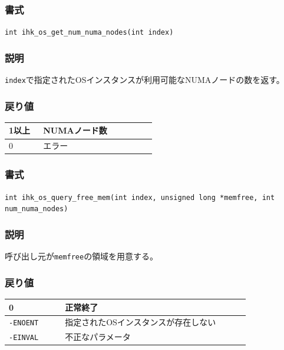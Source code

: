 \documentclass[twoside,11pt,fleqn]{book}
\begin{document}
\subsubsection{}
\subsubsection*{書式}{\quad} \texttt{int ihk\_os\_get\_num\_numa\_nodes(int index)}
\subsubsection*{説明}{\quad} \texttt{index}で指定されたOSインスタンスが利用可能なNUMAノードの数を返す。
\subsubsection*{戻り値}
\begin{table}[!h]
\footnotesize
\begin{tabular}{|p{0.20\linewidth}|p{0.66\linewidth}|} \hline
1以上&NUMAノード数\\ \hline
0&エラー\\ \hline
\end{tabular}
\vspace{-0em}
\end{table}
\FloatBarrier

\subsubsection{}
\subsubsection*{書式}{\quad} \texttt{int ihk\_os\_query\_free\_mem(int index, unsigned long *memfree, int num\_numa\_nodes)}
\subsubsection*{説明}{\quad} 呼び出し元が\texttt{memfree}の領域を用意する。
\subsubsection*{戻り値}
\begin{table}[!h]
\footnotesize
\begin{tabular}{|p{0.20\linewidth}|p{0.66\linewidth}|} \hline
0&正常終了\\ \hline
\texttt{-ENOENT}&指定されたOSインスタンスが存在しない\\ \hline
\texttt{-EINVAL}&不正なパラメータ\\ \hline
\end{tabular}
\vspace{-0em}
\end{table}
\FloatBarrier
 
\end{document}
